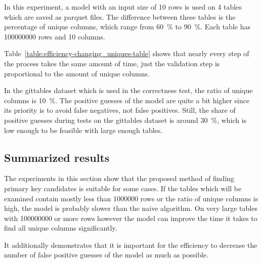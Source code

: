 In this experiment, a model with an input size of 10 rows is used on 4 tables which are saved as parquet files. The difference between these tables is the percentage of unique columns, which range from \SI{60}{\percent} to \SI{90}{\percent}. Each table has \num{100000000} rows and \num{10} columns.

Table~\ref{table:efficiency-changing_uniques-table} shows that nearly every step of the process takes the same amount of time, just the validation step is proportional to the amount of unique columns.

In the gittables dataset which is used in the correctness test, the ratio of unique columns is \SI{10}{\percent}. The positive guesses of the model are quite a bit higher since its priority is to avoid false negatives, not false positives. Still, the share of positive guesses during tests on the gittables dataset is around \SI{30}{\percent}, which is low enough to be feasible with large enough tables. %


\subsection{Summarized results}\label{subsec:efficiency-summarized_results}
The experiments in this section show that the proposed method of finding primary key candidates is suitable for some cases. If the tables which will be examined contain mostly less than \num{1000000} rows or the ratio of unique columns is high, the model is probably slower than the naive algorithm. On very large tables with \num{100000000} or more rows however the model can improve the time it takes to find all unique columns significantly. %

It additionally demonstrates that it is important for the efficiency to decrease the number of false positive guesses of the model as much as possible.

